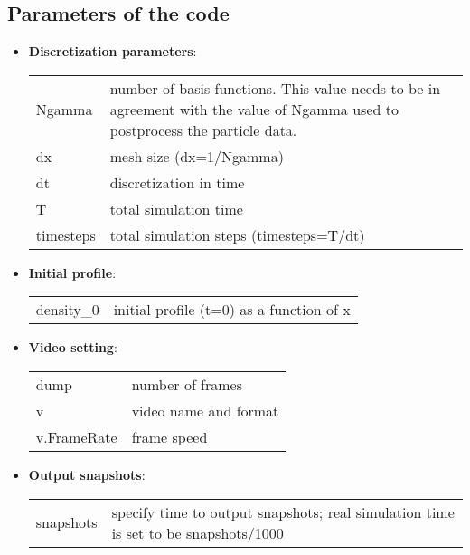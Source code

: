 \documentclass[authoryear,3p,11pt]{elsarticle}
\begin{document}
\subsection{Parameters of the code} 

\begin{itemize}
\item {\bf Discretization parameters}:

\begin{tabular}{ p{2.2cm} p{12.5cm} }
Ngamma &  number of basis functions. This value needs to be in agreement with the value of Ngamma used to postprocess the particle data.\\
dx & mesh size (dx=1/Ngamma)\\
dt & discretization in time\\
T & total simulation time\\
timesteps &  total simulation steps (timesteps=T/dt)\\
\end{tabular}

\item {\bf Initial profile}: 

\begin{tabular}{p{2.2cm} p{12.5cm}  }
density\_0 &  initial profile (t=0) as a function of x 
\end{tabular}

\item {\bf Video setting}:

\begin{tabular}{p{2.2cm} p{12.5cm}  }
dump &  number of frames\\
v &   video name and format\\
v.FrameRate & frame speed
\end{tabular}

\item {\bf Output snapshots}:

\begin{tabular}{p{2.2cm} p{12.5cm}  }
snapshots & specify time to output snapshots; real simulation time is set to be snapshots/1000
\end{tabular}

\end{itemize}
\end{document}
